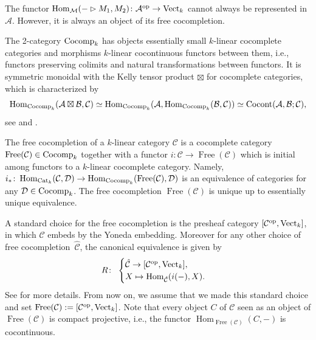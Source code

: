 \documentclass[pdftex]{sigma}%
\numberwithin{equation}{section}
\newcommand{\Free}{\operatorname{Free}}
\newcommand{\Hom}{\operatorname{Hom}}
\begin{document}
The functor $\Hom_\mathcal{M}(-\rhd M_1, M_2)\colon\mathcal{A}^{\rm op} \to {\rm Vect}_k$ cannot always be represented in $\mathcal{A}$. However, it is always an object of its free cocompletion.
\begin{Definition}
The 2-category ${\rm Cocomp}_k$ has objects essentially small $k$-linear cocomplete categories and morphisms $k$-linear cocontinuous functors between them, i.e., functors preserving colimits and natural transformations between functors.
It is symmetric monoidal with the Kelly tensor product $\boxtimes$ for cocomplete categories, which is characterized by
\[
\Hom_{{\rm Cocomp}_k}(\mathcal{A} \boxtimes \mathcal{B},\mathcal{C}) \simeq \Hom_{{\rm Cocomp}_k}(\mathcal{A},\Hom_{{\rm Cocomp}_k}(\mathcal{B},\mathcal{C})) \simeq {\rm Cocont}(\mathcal{A},\mathcal{B};\mathcal{C}),
\]
see \cite[Section~6.5]{Kelly2} and \cite[Theorem~2.45]{Ramos}.

The free cocompletion of a $k$-linear category $\mathcal{C}$ is a cocomplete category $\Free(\mathcal{C}) \in {\rm Cocomp}_k$ together with a functor $i\colon \mathcal{C} \to \Free(\mathcal{C})$ which is initial among functors to a $k$-linear cocomplete category. Namely, $i_*\colon \Hom_{{\rm Cat}_k}(\mathcal{C},\mathcal{D}) \to \Hom_{{\rm Cocomp}_k}(\Free(\mathcal{C}),\mathcal{D})$ is an equivalence of categories for any $\mathcal{D}\in {\rm Cocomp}_k$. The free cocompletion $\Free(\mathcal{C})$ is unique up to essentially unique equivalence.
\end{Definition}

\begin{Remark}\label{rmkFreeIsPresheaves}
A standard choice for the free cocompletion is the presheaf category $[\mathcal{C}^{\rm op},{\rm Vect}_k]$, in which $\mathcal{C}$ embeds by the Yoneda embedding. Moreover for any other choice of free cocompletion~$\hat{\mathcal{C}}$, the canonical equivalence is given by
\[
R\colon\ \begin{cases}
\hat{\mathcal{C}}  \to  [\mathcal{C}^{\rm op},{\rm Vect}_k],
\\
X \mapsto  \Hom_{\hat{\mathcal{C}}}(i(-),X).\end{cases}
\]
See \cite[Section~2.2]{Dugger} for more details. From now on, we assume that we made this standard choice and set $\Free(\mathcal{C}) := [\mathcal{C}^{\rm op},{\rm Vect}_k]$.
Note that every object $C$ of $\mathcal{C}$ seen as an object of $\Free(\mathcal{C})$ is compact projective, i.e., the functor $\Hom_{\Free(\mathcal{C})}(C,-)$ is cocontinuous.
\end{Remark}
\end{document}
